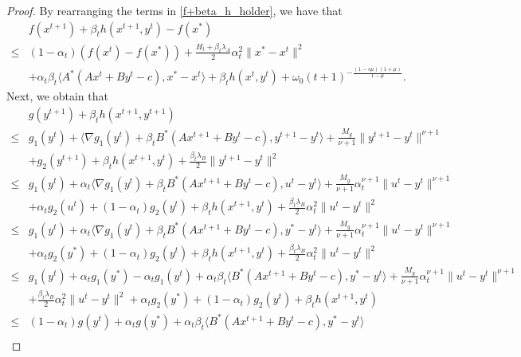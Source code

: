 \documentclass{article}
\numberwithin{equation}{section}
\begin{document}
\begin{proof}
    By rearranging the terms in \eqref{f+beta_h_holder}, we have that 
    \begin{align} 
        &f(x^{t+1}) +\beta_th(x^{t+1},y^t) -f(x^*)\nonumber \\
        \leq & (1-\alpha_t)(f(x^t)-f(x^*))+\frac{H_t+\beta_t\lambda_A}{2}\alpha_t^2\|x^*-x^t\rVert^2  \nonumber \\
        &+\alpha_t\beta_t\langle A^*(Ax^t+By^t-c), x^*-x^t\rangle+ \beta_th(x^t,y^t) +\omega_0(t+1)^{-\frac{(1-s\mu)(1+\mu)}{1-\mu}}.  \label{f+beta_h-f*}
    \end{align}
    Next, we obtain that 
    \begin{align}
        &g(y^{t+1}) + \beta_th(x^{t+1},y^{t+1}) \nonumber \\
        \overset{\mathop{(a)}}{\leq}& g_1(y^{t})+ \langle \nabla g_1(y^t)+\beta_tB^*(Ax^{t+1}+By^t-c), y^{t+1}-y^t\rangle + 
        \frac{M_g}{\nu+1}\|y^{t+1}-y^t\rVert^{\nu+1} \nonumber\\
        &+g_2(y^{t+1}) +\beta_th(x^{t+1},y^t)+\frac{\beta_t\lambda_B}{2}\|y^{t+1}-y^t\rVert^2 \nonumber \\
        \overset{\mathop{(b)}}{\leq}& g_1(y^{t})+ \alpha_t\langle \nabla g_1(y^t)+\beta_tB^*(Ax^{t+1}+By^t-c), u^t-y^t\rangle + 
        \frac{M_g}{\nu+1}\alpha_t^{\nu+1}\|u^t-y^t\rVert^{\nu+1} \nonumber\\
        &+\alpha_tg_2(u^t)+(1-\alpha_t)g_2(y^{t}) +\beta_th(x^{t+1},y^t)+\frac{\beta_t\lambda_B}{2}\alpha_t^2\|u^t-y^t\rVert^2\nonumber \\
        \overset{\mathop{(c)}}{\leq}& g_1(y^{t})+ \alpha_t\langle \nabla g_1(y^t)+\beta_tB^*(Ax^{t+1}+By^t-c), y^*-y^t\rangle + 
        \frac{M_g}{\nu+1}\alpha_t^{\nu+1}\|u^t-y^t\rVert^{\nu+1} \nonumber\\
        &+\alpha_tg_2(y^*)+(1-\alpha_t)g_2(y^{t}) +\beta_th(x^{t+1},y^t)+\frac{\beta_t\lambda_B}{2}\alpha_t^2\|u^t-y^t\rVert^2 \nonumber \\
        \overset{\mathop{(d)}}{\leq}& g_1(y^{t})+\alpha_tg_1(y^*)-\alpha_tg_1(y^t)+ \alpha_t\beta_t\langle B^*(Ax^{t+1}+By^t-c), y^*-y^t\rangle + 
        \frac{M_g}{\nu+1}\alpha_t^{\nu+1}\|u^t-y^t\rVert^{\nu+1} \nonumber\\
        &+\frac{\beta_t\lambda_B}{2}\alpha_t^2\|u^t-y^t\rVert^2+\alpha_tg_2(y^*)+(1-\alpha_t)g_2(y^{t}) +\beta_th(x^{t+1},y^t) \nonumber \\
        \overset{\mathop{(e)}}{\leq}& (1-\alpha_t)g(y^{t})+\alpha_tg(y^*)+ \alpha_t\beta_t\langle B^*(Ax^{t+1}+By^t-c), y^*-y^t\rangle  \nonumber\\

\end{align}
\end{proof}
\end{document}
